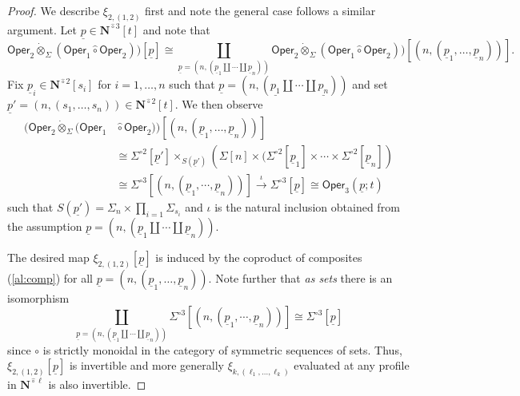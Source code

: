 \documentclass[11pt]{amsart}
\theoremstyle{definition}
\theoremstyle{remark}
\newcommand{\Oper}{\mathsf{Oper}}
\newcommand{\Ncirc}[1]{\mathbf{N}^{\hat{\circ}#1}}
\newcommand{\circhat}{\hat{\circ}}
\newcommand{\tensordot}{\dot{\otimes}}
\begin{document}
\begin{proof}
We describe $\xi_{2,(1,2)}$ first and note the general case follows a similar argument. Let $\underline{p}\in \Ncirc{3}[t]$ and note that \[ 
    \Oper_2 \tensordot_{\Sigma}  (\Oper_1 \circhat \Oper_2) )[\underline{p}] \cong \coprod_{\underline{p}=(n,(\underline{p}_1 \amalg \cdots \amalg \underline{p}_n))} \Oper_2 \tensordot_{\Sigma}  (\Oper_1 \circhat \Oper_2) )[(n, (\underline{p}_1,\dots,\underline{p}_n))]. \] 
Fix $\underline{p}_i\in \Ncirc{2}[s_i]$ for $i=1,\dots,n$ such that $\underline{p}=(n, (\underline{p_1} \amalg \cdots \amalg \underline{p_n}))$ and set $\underline{p}'=(n,(s_1,\dots,s_n))\in \Ncirc{2}[t]$. We then observe
\begin{align} \label{al:comp}
    (\Oper_2 \tensordot_{\Sigma}  (\Oper_1  &\circhat \Oper_2  ) )[(n, (\underline{p}_1,\dots,\underline{p}_n))]
    \\
    &\cong \Sigma^{\circ 2}[\underline{p}'] \times_{S(\underline{p}')} \left( \Sigma[n] \times ( \Sigma^{\circ 2} [\underline{p}_1] \times \cdots \times \Sigma^{\circ 2}[\underline{p}_n] \right) \nonumber
    \\
    &\cong  \Sigma^{\circ 3} [(n, (\underline{p}_1,\cdots,\underline{p}_n))] \xrightarrow{\iota} \Sigma^{\circ 3}[\underline{p}] \cong \Oper_3(\underline{p};t)\nonumber
\end{align}
such that $S(\underline{p'})=\Sigma_n \times \prod_{i=1} \Sigma_{s_i}$ and $\iota$ is the natural inclusion obtained from the assumption $\underline{p}=(n, (\underline{p}_1 \amalg \cdots \amalg \underline{p}_n))$.

The desired map $\xi_{2,(1,2)}[\underline{p}]$ is induced by the coproduct of composites (\ref{al:comp}) for all $\underline{p}=(n,(\underline{p}_1,\dots,\underline{p}_n))$. Note further that \textit{as sets} there is an isomorphism \[ 
    \coprod_{\underline{p}=(n,(\underline{p}_1 \amalg \cdots \amalg \underline{p}_n))} \Sigma^{\circ 3} [(n,(\underline{p}_1,\cdots, \underline{p}_n))] \cong \Sigma^{\circ 3}[\underline{p}]
\] 
since $\circ$ is strictly monoidal in the category of symmetric sequences of sets. Thus, $\xi_{2,(1,2)}[\underline{p}]$ is invertible and more generally $\xi_{k,(\ell_1,\dots,\ell_k)}$ evaluated at any profile in $\Ncirc{\ell}$ is also invertible.


\end{proof}
\end{document}
